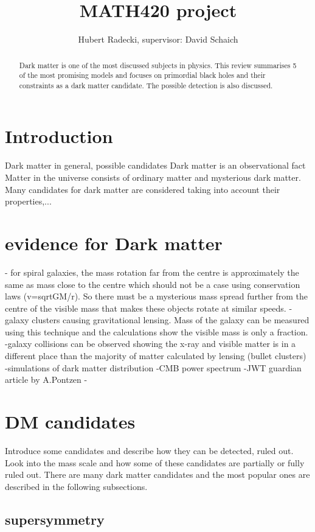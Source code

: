 \documentclass{article}
\begin{document}
\title{MATH420 project}
\author{Hubert Radecki, supervisor: David Schaich}
\maketitle

\begin{abstract}
Dark matter is one of the most discussed subjects in physics. This review summarises 5 of the most promising models and focuses on primordial black holes and their constraints as a dark matter candidate. The possible detection is also discussed.   
\end{abstract}

\tableofcontents

\section{Introduction}
Dark matter in general, possible candidates
Dark matter is an observational fact
Matter in the universe consists of ordinary matter and mysterious dark matter.
Many candidates for dark matter are considered taking into account their properties,...
\section {evidence for Dark matter}
- for spiral galaxies, the mass rotation far from the centre is approximately the same as mass close to the centre which should not be a case using conservation laws (v=sqrtGM/r). So there must be a mysterious mass spread further from the centre of the visible mass that makes these objects rotate at similar speeds.  
-galaxy clusters causing gravitational lensing. Mass of the galaxy can be measured using this technique and the calculations show the visible mass is only a fraction. 
-galaxy collisions can be observed showing the x-ray and visible matter is in a different place than the majority of matter calculated by lensing (bullet clusters)
-simulations of dark matter distribution 
-CMB power spectrum
-JWT guardian article by A.Pontzen
-
\section {DM candidates}
Introduce some candidates and describe how they can be detected, ruled out. 
Look into the mass scale and how some of these candidates are partially or fully ruled out. 
There are many dark matter candidates and the most popular ones are described in the following subsections. 
\subsection{supersymmetry}
\end{document}
